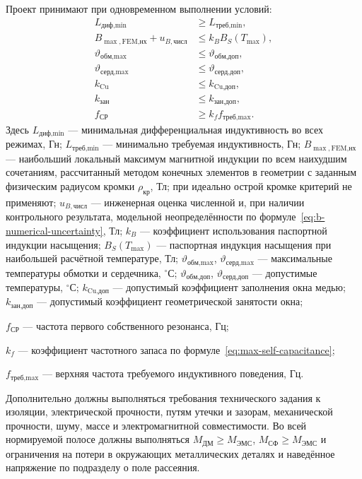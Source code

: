 \documentclass[14pt,a4paper]{extarticle}
\begin{document}
Проект принимают при одновременном выполнении условий:
\begin{align}
 L_{\text{диф,min}}&\geq L_{\text{треб,min}},
 \label{eq:constraint-l}\\
 B_{\max,\text{FEM,нх}}+u_{B,\text{числ}}
 &\leq k_BB_S(T_{\max}),
 \label{eq:acceptance-b-fem}\\
 \vartheta_{\text{обм,max}}&\leq\vartheta_{\text{обм,доп}},
 \label{eq:constraint-tw}\\
 \vartheta_{\text{серд,max}}&\leq\vartheta_{\text{серд,доп}},
 \label{eq:constraint-tc}\\
 k_{\text{Cu}}&\leq k_{\text{Cu,доп}},
 \label{eq:constraint-kw}\\
 k_{\text{зан}}&\leq k_{\text{зан,доп}},
 \label{eq:constraint-kocc}\\
 f_{\text{СР}}&\geq k_f f_{\text{треб,max}}.
 \label{eq:constraint-srf}
\end{align}
Здесь $L_{\text{диф,min}}$ --- минимальная дифференциальная
индуктивность во всех режимах, Гн;
$L_{\text{треб,min}}$ --- минимально требуемая индуктивность, Гн;
$B_{\max,\text{FEM,нх}}$ --- наибольший локальный максимум магнитной
индукции по всем наихудшим сочетаниям, рассчитанный методом конечных
элементов в геометрии с заданным физическим радиусом кромки
$\rho_{\text{кр}}$, Тл; при идеально острой кромке критерий не применяют;
$u_{B,\text{числ}}$ --- инженерная оценка численной и, при наличии
контрольного результата, модельной неопределённости по
формуле~\eqref{eq:b-numerical-uncertainty}, Тл;
$k_B$ --- коэффициент использования паспортной индукции насыщения;
$B_S(T_{\max})$ --- паспортная индукция насыщения при наибольшей расчётной
температуре, Тл;
$\vartheta_{\text{обм,max}}$, $\vartheta_{\text{серд,max}}$ ---
максимальные температуры обмотки и сердечника, $^{\circ}\text{С}$;
$\vartheta_{\text{обм,доп}}$, $\vartheta_{\text{серд,доп}}$ ---
допустимые температуры, $^{\circ}\text{С}$;
$k_{\text{Cu,доп}}$ --- допустимый коэффициент заполнения окна медью;
$k_{\text{зан,доп}}$ --- допустимый коэффициент геометрической занятости
окна;\par\noindent
$f_{\text{СР}}$ --- частота первого собственного резонанса, Гц;\par\noindent
$k_f$ --- коэффициент частотного запаса по
формуле~\eqref{eq:max-self-capacitance};\par\noindent
$f_{\text{треб,max}}$ --- верхняя частота требуемого индуктивного поведения,
Гц.

Дополнительно должны выполняться требования технического задания к
изоляции, электрической прочности, путям утечки и зазорам, механической
прочности, шуму, массе и электромагнитной совместимости. Во всей
нормируемой полосе должны выполняться
$M_{\text{ДМ}}\geq M_{\text{ЭМС}}$,
$M_{\text{СФ}}\geq M_{\text{ЭМС}}$ и ограничения на потери в окружающих
металлических деталях и наведённое напряжение по
подразделу о поле рассеяния.
\end{document}
